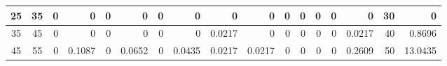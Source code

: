 \begin{table}[ht]
\begin{adjustbox}{width = \textwidth, center}
\begin{tabular}{|cc|r|r|r|r|r|r|r|r|r|r|r|r|r|r|r|}
            \cellcolor[HTML]{C9DAF8}25             & \cellcolor[HTML]{EBF1FC}35             & 0                                              & 0                                              & 0                                              & 0                                              & 0                                              & 0                                              & 0                                              & 0                                               & 0                                               & 0                                               & 0                                               & 0                                               & \cellcolor[HTML]{D9D2E9}0                                                       & \cellcolor[HTML]{D9D2E9}30                                              & \cellcolor[HTML]{D9D2E9}0                                                                        \\ \hline
            \rowcolor[HTML]{FFFFFF} 
            \cellcolor[HTML]{C9DAF8}35             & \cellcolor[HTML]{EBF1FC}45             & 0                                              & 0                                              & 0                                              & 0                                              & 0                                              & 0                                              & \cellcolor[HTML]{DEF2E8}0.0217                 & 0                                               & 0                                               & 0                                               & 0                                               & 0                                               & \cellcolor[HTML]{D9D2E9}0.0217                                                  & \cellcolor[HTML]{D9D2E9}40                                              & \cellcolor[HTML]{D9D2E9}0.8696                                                                   \\ \hline
            \cellcolor[HTML]{C9DAF8}45             & \cellcolor[HTML]{EBF1FC}55             & \cellcolor[HTML]{FFFFFF}0                      & \cellcolor[HTML]{57BB8A}0.1087                 & \cellcolor[HTML]{FFFFFF}0                      & \cellcolor[HTML]{9BD7B9}0.0652                 & \cellcolor[HTML]{FFFFFF}0                      & \cellcolor[HTML]{BCE4D1}0.0435                 & \cellcolor[HTML]{DEF2E8}0.0217                 & \cellcolor[HTML]{DEF2E8}0.0217                  & \cellcolor[HTML]{FFFFFF}0                       & \cellcolor[HTML]{FFFFFF}0                       & \cellcolor[HTML]{FFFFFF}0                       & \cellcolor[HTML]{FFFFFF}0                       & \cellcolor[HTML]{D9D2E9}0.2609                                                  & \cellcolor[HTML]{D9D2E9}50                                              & \cellcolor[HTML]{D9D2E9}13.0435                                                                  \\ \hline

\end{tabular}
\end{adjustbox}
\end{table}
